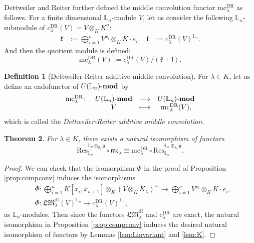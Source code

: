 \documentclass[a4paper,12pt]{article}
\newtheorem{thm}{Theorem}[section]
\theoremstyle{definition}
\newtheorem{df}[thm]{Definition}
\theoremstyle{remark}
\begin{document}
Dettweiler and Reiter further defined the middle convolution functor $\mathrm{mc}_{\lambda}^{\mathrm{DR}}$ as follows.
For a finite dimensional $\mathbb{L}_{n}$-module $V$, 
let us consider  the following $\mathbb{L}_{n}$-submodule of $c^{\mathrm{DR}}_{\lambda}(V)=
V\otimes_{K}K^{n}$:
\begin{align*}
	\mathfrak{k}&:=\bigoplus_{i=1}^{n} V^{x_{i}}\otimes _{K}K\cdot e_{i},&
	\mathfrak{l}&:=c^{\mathrm{DR}}_{\lambda}(V)^{\mathbb{L}_{n}}.
\end{align*}
And then the quotient module is defined:
\[
	\mathrm{mc}^{\mathrm{DR}}_{\lambda}(V):=c^{\mathrm{DR}}_{\lambda}(V)/(\mathfrak{k}+\mathfrak{l}).
\]
\begin{df}[Dettweiler-Reiter additive middle convolution]
	For $\lambda\in K$, let us define an endofunctor 
	of $U(\mathbb{L}_{n})\text{-\textbf{mod}}$ by 
	\[
		\begin{array}{cccc}
			\mathrm{mc}^{\mathrm{DR}}_{\lambda}\colon &U(\mathbb{L}_{n})\text{-\textbf{mod}}&
			\longrightarrow &U(\mathbb{L}_{n})\text{-\textbf{mod}}\\
			&V&\longmapsto&\mathrm{mc}^{\mathrm{DR}}_{\lambda}(V),
		\end{array}
	\]
	which is called the \emph{Dettweiler-Reiter additive middle convolution}.
\end{df}
\begin{thm}\label{thm:compmc}
For $\lambda\in K$, there exists a natural isomorphism of functors
\[
	\mathrm{Res}_{\mathbb{L}_{n}}^{\mathbb{L}_{n}\oplus_{\theta_{g}}\mathfrak{g}}\circ \mathfrak{mc}_{\lambda}
	\cong \mathrm{mc}^{\mathrm{DR}}_{\lambda}\circ \mathrm{Res}_{\mathbb{L}_{n}}^{\mathbb{L}_{n}\oplus_{\theta_{g}}\mathfrak{g}}.
\]
\end{thm}
\begin{proof}
	We can check that the isomorphism $\Phi$ in the proof of Proposition \ref{prop:compconv} induces the isomorphisms
	\begin{align*}
		&\Phi\colon \bigoplus_{i=1}^{n} K[x_{i},x_{n+1}]\otimes_{K}(V\otimes_{K}K_{\lambda})^{x_{i}}\to \bigoplus_{i=1}^{n} V^{x_{i}}\otimes_{K} K\cdot e_{i},\\
		&\Phi\colon \mathfrak{LM}^{\mathrm{df}}_{\lambda}(V)^{\mathbb{L}_{n}}\to c^{\mathrm{DR}}_{\lambda}(V)^{\mathbb{L}_{n}},
	\end{align*}
	as $\mathbb{L}_{n}$-modules.
	Then since the functors $\mathfrak{LM}^{\mathrm{df}}_{\lambda}$ and $c^{\mathrm{DR}}_{\lambda}$ are exact, 
	the natural isomorphism in  Proposition \ref{prop:compconv}
	induces the desired natural isomorphism of functors
	by Lemmas \ref{lem:Linvariant} and \ref{lem:K}.
\end{proof}
\end{document}

